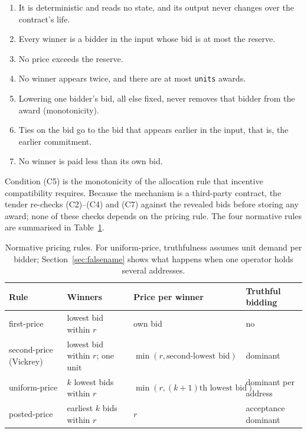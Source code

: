 \documentclass[11pt]{article}
\theoremstyle{definition}
\theoremstyle{remark}
\newcommand{\code}[1]{\texttt{#1}}
\begin{document}
\begin{enumerate}[leftmargin=*,itemsep=1pt,label=(C\arabic*)]
\item It is deterministic and reads no state, and its output never changes over the contract's life.
\item Every winner is a bidder in the input whose bid is at most the reserve.
\item No price exceeds the reserve.
\item No winner appears twice, and there are at most \code{units} awards.
\item Lowering one bidder's bid, all else fixed, never removes that bidder from the award (monotonicity).
\item Ties on the bid go to the bid that appears earlier in the input, that is, the earlier commitment.
\item No winner is paid less than its own bid.
\end{enumerate}

Condition (C5) is the monotonicity of the allocation rule that incentive compatibility requires. Because the mechanism is a third-party contract, the tender re-checks (C2)--(C4) and (C7) against the revealed bids before storing any award; none of these checks depends on the pricing rule. The four normative rules are summarised in Table~\ref{tab:rules}.

\begin{table}[t]
\centering
\small
\begin{tabular}{@{}llll@{}}
\toprule
Rule & Winners & Price per winner & Truthful bidding \\
\midrule
first-price & lowest bid within $r$ & own bid & no \\
second-price (Vickrey) & lowest bid within $r$; one unit & $\min(r, \text{second-lowest bid})$ & dominant \\
uniform-price & $k$ lowest bids within $r$ & $\min(r, (k{+}1)\text{th lowest bid})$ & dominant per address \\
posted-price & earliest $k$ bids within $r$ & $r$ & acceptance dominant \\
\bottomrule
\end{tabular}
\caption{Normative pricing rules. For uniform-price, truthfulness assumes unit demand per bidder; Section~\ref{sec:falsename} shows what happens when one operator holds several addresses.}
\label{tab:rules}
\end{table}
\end{document}
